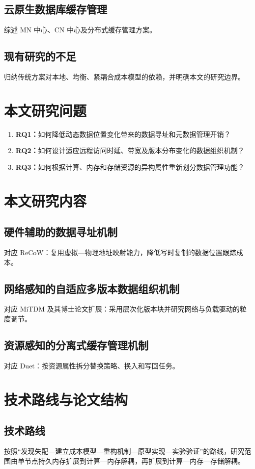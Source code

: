 \subsection{云原生数据库缓存管理}
综述 MN 中心、CN 中心及分布式缓存管理方案。
\subsection{现有研究的不足}
归纳传统方案对本地、均衡、紧耦合成本模型的依赖，并明确本文的研究边界。

\section{本文研究问题}
\begin{enumerate}
  \item \textbf{RQ1：}如何降低动态数据位置变化带来的数据寻址和元数据管理开销？
  \item \textbf{RQ2：}如何设计适应远程访问时延、带宽及版本分布变化的数据组织机制？
  \item \textbf{RQ3：}如何根据计算、内存和存储资源的异构属性重新划分数据管理功能？
\end{enumerate}

\section{本文研究内容}
\subsection{硬件辅助的数据寻址机制}
对应 ReCoW：复用虚拟—物理地址映射能力，降低写时复制的数据位置跟踪成本。
\subsection{网络感知的自适应多版本数据组织机制}
对应 MiTDM 及其博士论文扩展：采用层次化版本块并研究网络与负载驱动的粒度调节。
\subsection{资源感知的分离式缓存管理机制}
对应 Duet：按资源属性拆分替换策略、换入和写回任务。

\section{技术路线与论文结构}
\subsection{技术路线}
按照“发现失配—建立成本模型—重构机制—原型实现—实验验证”的路线，研究范围由单节点持久内存扩展到计算—内存解耦，再扩展到计算—内存—存储解耦。
